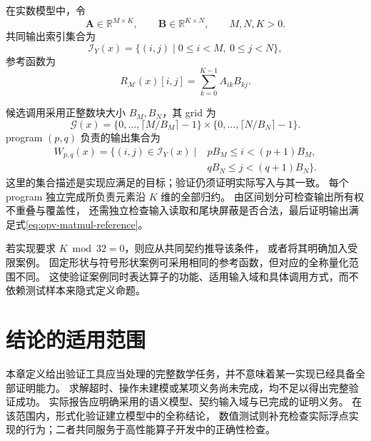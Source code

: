 在实数模型中，令
\begin{equation}
  \symbf{A}\in\mathbb{R}^{M\times K},\qquad
  \symbf{B}\in\mathbb{R}^{K\times N},\qquad M,N,K>0.
\end{equation}
共同输出索引集合为
\begin{equation}
  \mathcal{I}_Y(x)=
  \{(i,j)\mid 0\le i<M,\ 0\le j<N\},
\end{equation}
参考函数为
\begin{equation}
  R_{\mathcal{M}}(x)[i,j]
  =\sum_{k=0}^{K-1}A_{ik}B_{kj}.
  \label{eq:opv-matmul-reference}
\end{equation}

候选调用采用正整数块大小 $B_M,B_N$，其 grid 为
\begin{equation}
  \mathcal{G}(x)=
  \{0,\dots,\lceil M/B_M\rceil-1\}
  \times\{0,\dots,\lceil N/B_N\rceil-1\}.
\end{equation}
program $(p,q)$ 负责的输出集合为
\begin{equation}
  \begin{aligned}
    W_{p,q}(x)=\{(i,j)\in\mathcal{I}_Y(x)\mid{}&
      pB_M\le i<(p+1)B_M,\\
      &qB_N\le j<(q+1)B_N\}.
  \end{aligned}
\end{equation}
这里的集合描述是实现应满足的目标；验证仍须证明实际写入与其一致。
每个 program 独立完成所负责元素沿 $K$ 维的全部归约。
由区间划分可检查输出所有权不重叠与覆盖性，
还需独立检查输入读取和尾块屏蔽是否合法，最后证明输出满足式\eqref{eq:opv-matmul-reference}。

若实现要求 $K\bmod32=0$，则应从共同契约推导该条件，
或者将其明确加入受限案例。
固定形状与符号形状案例可采用相同的参考函数，但对应的全称量化范围不同。
这使验证案例同时表达算子的功能、适用输入域和具体调用方式，而不依赖测试样本来隐式定义命题。

\section{结论的适用范围}

本章定义给出验证工具应当处理的完整数学任务，并不意味着某一实现已经具备全部证明能力。
求解超时、操作未建模或某项义务尚未完成，均不足以得出完整验证成功。
实际报告应明确采用的语义模型、契约输入域与已完成的证明义务。
在该范围内，形式化验证建立模型中的全称结论，
数值测试则补充检查实际浮点实现的行为；二者共同服务于高性能算子开发中的正确性检查。
